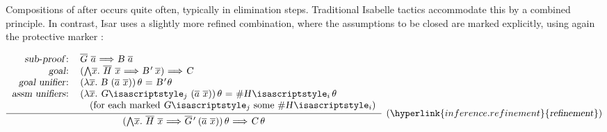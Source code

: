 \begin{isabellebody}
\begin{isamarkuptext}
  Compositions of \hyperlink{inference.assumption}{\mbox{}} after \hyperlink{inference.resolution}{\mbox{}} occurs quite often, typically in elimination steps.
  Traditional Isabelle tactics accommodate this by a combined
  \hypertarget{inference.elim-resolution}{\hyperlink{inference.elim-resolution}{\mbox{}}} principle.  In contrast, Isar uses
  a slightly more refined combination, where the assumptions to be
  closed are marked explicitly, using again the protective marker
  \isa{{\isachardoublequote}{\isacharhash}{\isachardoublequote}}:

  \[
  \infer[(\hyperlink{inference.refinement}{\mbox{\isa{refinement}}})]
  {\isa{{\isachardoublequote}{\isacharparenleft}{\isasymAnd}\isactrlvec x{\isachardot}\ \isactrlvec H\ \isactrlvec x\ {\isasymLongrightarrow}\ \isactrlvec G{\isacharprime}\ {\isacharparenleft}\isactrlvec a\ \isactrlvec x{\isacharparenright}{\isacharparenright}{\isasymvartheta}\ {\isasymLongrightarrow}\ C{\isasymvartheta}{\isachardoublequote}}}
  {\begin{tabular}{rl}
    \isa{{\isachardoublequote}sub{\isasymdash}proof{\isacharcolon}{\isachardoublequote}} &
    \isa{{\isachardoublequote}\isactrlvec G\ \isactrlvec a\ {\isasymLongrightarrow}\ B\ \isactrlvec a{\isachardoublequote}} \\
    \isa{{\isachardoublequote}goal{\isacharcolon}{\isachardoublequote}} &
    \isa{{\isachardoublequote}{\isacharparenleft}{\isasymAnd}\isactrlvec x{\isachardot}\ \isactrlvec H\ \isactrlvec x\ {\isasymLongrightarrow}\ B{\isacharprime}\ \isactrlvec x{\isacharparenright}\ {\isasymLongrightarrow}\ C{\isachardoublequote}} \\
    \isa{{\isachardoublequote}goal\ unifier{\isacharcolon}{\isachardoublequote}} &
    \isa{{\isachardoublequote}{\isacharparenleft}{\isasymlambda}\isactrlvec x{\isachardot}\ B\ {\isacharparenleft}\isactrlvec a\ \isactrlvec x{\isacharparenright}{\isacharparenright}{\isasymvartheta}\ {\isacharequal}\ B{\isacharprime}{\isasymvartheta}{\isachardoublequote}} \\
    \isa{{\isachardoublequote}assm\ unifiers{\isacharcolon}{\isachardoublequote}} &
    \isa{{\isachardoublequote}{\isacharparenleft}{\isasymlambda}\isactrlvec x{\isachardot}\ G\isactrlsub j\ {\isacharparenleft}\isactrlvec a\ \isactrlvec x{\isacharparenright}{\isacharparenright}{\isasymvartheta}\ {\isacharequal}\ {\isacharhash}H\isactrlsub i{\isasymvartheta}{\isachardoublequote}} \\
    & \quad (for each marked \isa{{\isachardoublequote}G\isactrlsub j{\isachardoublequote}} some \isa{{\isachardoublequote}{\isacharhash}H\isactrlsub i{\isachardoublequote}}) \\
   \end{tabular}}
  \]


\end{isamarkuptext}
\end{isabellebody}
